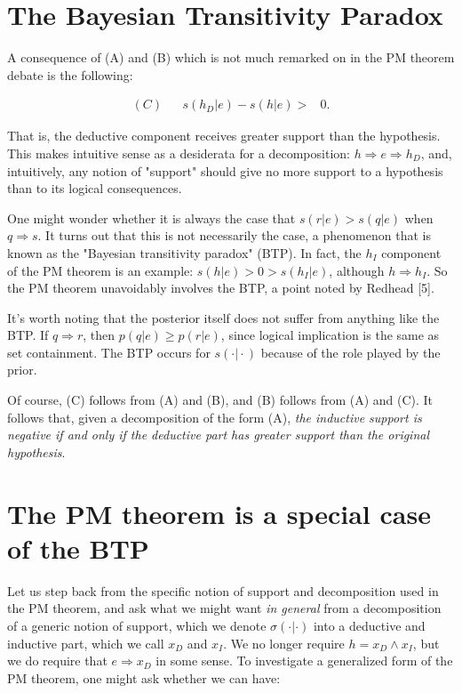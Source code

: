 \documentclass[twoside,11pt]{article}
\numberwithin{equation}{section}
\begin{document}
\section{The Bayesian Transitivity Paradox}

A consequence of (A) and (B) which is not much remarked on in the PM theorem
debate is the following:

\begin{align*}
(C) && s(h_D | e) - s(h | e) >{}& 0.
\end{align*}

That is, the deductive component receives greater support than the hypothesis.
This makes intuitive sense as a desiderata for a decomposition: $h \Rightarrow
e \Rightarrow h_D$, and, intuitively, any notion of "support" should give
no more support to a hypothesis than to its logical consequences.

One might wonder whether it is always the case that $s(r | e) > s(q | e)$ when
$q \Rightarrow s$.  It turns out that this is not necessarily the case, a
phenomenon that is known as the "Bayesian transitivity paradox" (BTP). In fact,
the $h_I$ component of the PM theorem is an example: $s(h | e) > 0 > s(h_I |
e)$, although $h \Rightarrow h_I$.  So the PM theorem unavoidably  involves
the BTP, a point noted by Redhead [5].

It's worth noting that the posterior itself does not suffer from anything like
the BTP.  If $q \Rightarrow r$, then $p(q | e) \ge p(r | e)$, since
logical implication is the same as set containment.  The BTP occurs for
$s(\cdot \vert \cdot)$ because of the role played by the prior.

Of course, (C) follows from (A) and (B), and (B) follows from (A) and (C).  It
follows that, given a decomposition of the form (A), \emph{the inductive support is
negative if and only if the deductive part has greater support than the original
hypothesis}.


\section{The PM theorem is a special case of the BTP}

Let us step back from the specific notion of support and decomposition used in
the PM theorem, and ask what we might want \emph{in general} from a decomposition of
a generic notion of support, which we denote $\sigma(\cdot | \cdot)$ into a
deductive and inductive part, which we call $x_D$ and $x_I$.  We no longer
require $h = x_D \land x_I$, but we do require that $e \Rightarrow x_D$ in
some sense. To investigate a generalized form of the PM  theorem, one might ask
whether we can have:
\end{document}
